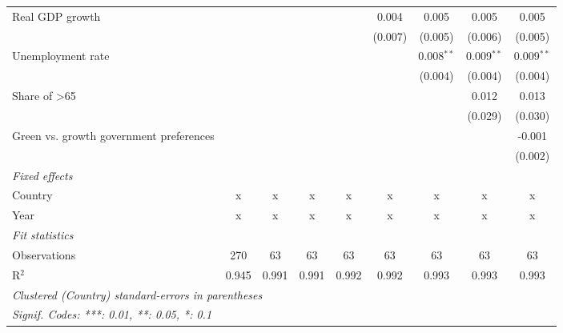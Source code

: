 \begin{table}[htbp]
\begin{tabular}{lcccccccc}
      Real GDP growth                                                                 &         &         &         &             & 0.004        & 0.005        & 0.005        & 0.005\\   
                                                                                      &         &         &         &             & (0.007)      & (0.005)      & (0.006)      & (0.005)\\   
      Unemployment rate                                                               &         &         &         &             &              & 0.008$^{**}$ & 0.009$^{**}$ & 0.009$^{**}$\\   
                                                                                      &         &         &         &             &              & (0.004)      & (0.004)      & (0.004)\\   
      Share of >65                                                                    &         &         &         &             &              &              & 0.012        & 0.013\\   
                                                                                      &         &         &         &             &              &              & (0.029)      & (0.030)\\   
      Green vs. growth government preferences                                         &         &         &         &             &              &              &              & -0.001\\   
                                                                                      &         &         &         &             &              &              &              & (0.002)\\   
      \emph{Fixed effects}\\
      Country                                                                         & x       & x       & x       & x           & x            & x            & x            & x\\  
      Year                                                                            & x       & x       & x       & x           & x            & x            & x            & x\\  
      \midrule \emph{Fit statistics}\\
      Observations                                                                    & 270     & 63      & 63      & 63          & 63           & 63           & 63           & 63\\  
      R$^2$                                                                           & 0.945   & 0.991   & 0.991   & 0.992       & 0.992        & 0.993        & 0.993        & 0.993\\  
      \midrule
      \multicolumn{9}{l}{\emph{Clustered (Country) standard-errors in parentheses}}\\
      \multicolumn{9}{l}{\emph{Signif. Codes: ***: 0.01, **: 0.05, *: 0.1}}\\
   \end{tabular}
\end{table}


